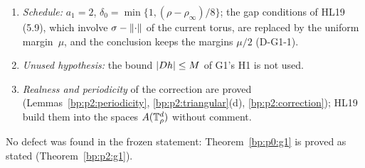 \begin{remark}
\begin{enumerate}[label=(V\arabic*)]
  from $\abs{M^\top}\le p\abs M$ (Remark~\ref{bp:p2:transposes}), which removes HL19's $\sigma_{K^\top}$
  and $c_{X_h^\top,1}$; HL19's parameter $\nu$ and condition (4.40) are replaced by $e\le1$, $\delta\le1$.
\item\label{bp:p2:V7} \emph{Schedule:} $a_1=2$, $\delta_0=\min\{1,(\rho-\rho_\infty)/8\}$; the gap conditions
  of HL19 (5.9), which involve $\sigma-\lVert \cdot\rVert$ of the current torus, are replaced by the uniform
  margin~$\mu$, and the conclusion keeps the margins $\mu/2$ (D-G1-1).
\item\label{bp:p2:V8} \emph{Unused hypothesis:} the bound $\lvert Dh\rvert\le M$ of G1's H1 is not used.
\item\label{bp:p2:V9} \emph{Realness and periodicity} of the correction are proved
  (Lemmas~\ref{bp:p2:periodicity}, \ref{bp:p2:triangular}(d), \ref{bp:p2:correction}); HL19 build them into
  the spaces $A(\mathbb{T}^d_\rho)$ without comment.
\end{enumerate}
No defect was found in the frozen statement: Theorem~\ref{bp:p0:g1} is proved as stated
(Theorem~\ref{bp:p2:g1}).
\end{remark}
